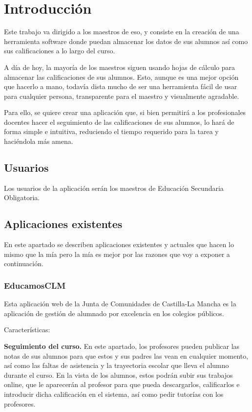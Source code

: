 \chapter{Introducción}
\label{cap:Introduccion}

Este trabajo va dirigido a los maestros de \gls{eso}, y consiste en la creación de una herramienta software donde puedan almacenar los datos de sus alumnos así como sus calificaciones a lo largo del curso.

A día de hoy, la mayoría de los maestros siguen usando hojas de cálculo para almacenar las calificaciones de sus alumnos. Esto, aunque es una mejor opción que hacerlo a mano, todavía dista mucho de ser una herramienta fácil de usar para cualquier persona, transparente para el maestro y visualmente agradable.

Para ello, se quiere crear una aplicación que, si bien permitirá a los profesionales docentes hacer el seguimiento de las calificaciones de sus alumnos, lo hará de forma simple e intuitiva, reduciendo el tiempo requerido para la tarea y haciéndola más amena.

\section{Usuarios}

Los usuarios de la aplicación serán los maestros de Educación Secundaria Obligatoria.

\section{Aplicaciones existentes}

En este apartado se describen aplicaciones existentes y actuales que hacen lo mismo que la mía pero la mía es mejor por las razones que voy a exponer a continuación.

\subsection{EducamosCLM}

Esta aplicación web de la Junta de Comunidades de Castilla-La Mancha es la aplicación de gestión de alumnado por excelencia en los colegios públicos. 

Características:

\textbf {Seguimiento del curso.}
    En este apartado, los profesores pueden publicar las notas de sus alumnos para que estos y sus padres las vean en cualquier momento, así como las faltas de asistencia y la trayectoria escolar que lleva el alumno durante el curso.
    En la vista de los alumnos, estos podrán subir sus trabajos online, que le aparecerán al profesor para que pueda descargarlos, calificarlos e introducir dicha calificación en el sistema, así como pedir tutorías con los profesores.
        

